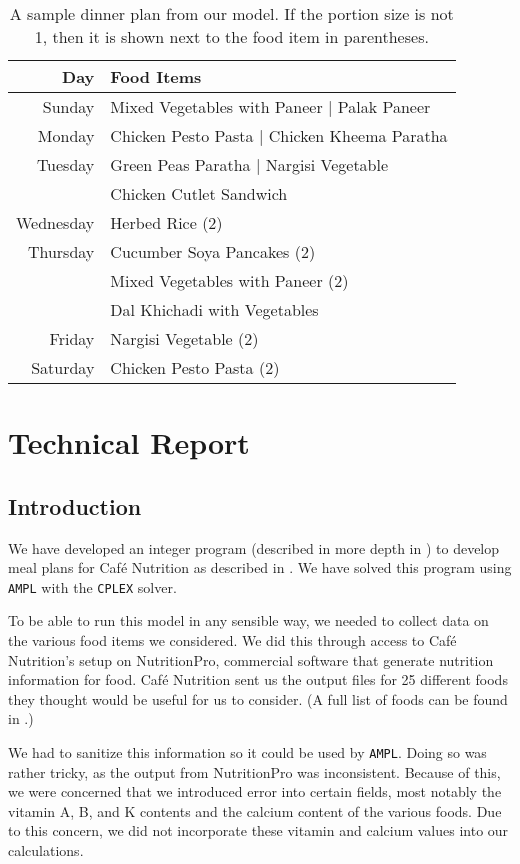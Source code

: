 \documentclass[twoside]{article}
\newcommand{\cn}{Caf\'e Nutrition\xspace}
\newcommand{\codeformat}[1]{\texttt{#1}}
\newcommand{\AMPL}{\codeformat{AMPL}\xspace}
\begin{document}
\begin{table*}[b!]
    \centering
    \begin{tabular}{r|l}
        \textbf{Day} & \textbf{Food Items}\\
        \hline
        Sunday & Mixed Vegetables with Paneer | Palak Paneer\\
        Monday & Chicken Pesto Pasta | Chicken Kheema Paratha\\
        Tuesday & Green Peas Paratha | Nargisi Vegetable\\
        & Chicken Cutlet Sandwich\\
        Wednesday & Herbed Rice (2)\\
        Thursday & Cucumber Soya Pancakes (2)\\
        & Mixed Vegetables with Paneer (2)\\
        & Dal Khichadi with Vegetables\\
        Friday & Nargisi Vegetable (2)\\
        Saturday & Chicken Pesto Pasta (2)
    \end{tabular}
    \caption{A sample dinner plan from our model. If the portion size is not 1, then it is shown next to the food item in parentheses.}
    \label{tab:sample-result}
\end{table*}
\clearpage

\section{Technical Report}
\subsection{Introduction}
\label{sec:report-intro}
We have developed an integer program (described in more depth in ) to develop meal plans for \cn as described in . We have solved this program using \AMPL with the \codeformat{CPLEX} solver.

To be able to run this model in any sensible way, we needed to collect data on the various food items we considered. We did this through access to \cn's setup on NutritionPro, commercial software that generate nutrition information for food. \cn sent us the output files for 25 different foods they thought would be useful for us to consider. (A full list of foods can be found in .)

We had to sanitize this information so it could be used by \AMPL. Doing so was rather tricky, as the output from NutritionPro was inconsistent. Because of this, we were concerned that we introduced error into certain fields, most notably the vitamin A, B, and K contents and the calcium content of the various foods. Due to this concern, we did not incorporate these vitamin and calcium values into our calculations.
\end{document}
